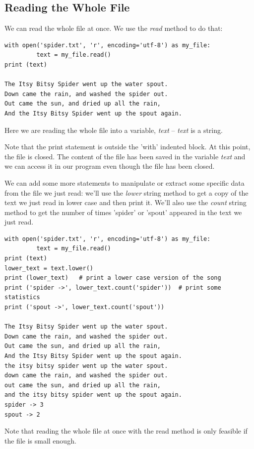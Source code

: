 \documentclass{article}
\begin{document}
\subsection{Reading the Whole File}

We can read the whole file at once.  We use the \textit{read} method to do that:

\begin{lstlisting}
with open('spider.txt', 'r', encoding='utf-8') as my_file:
         text = my_file.read()
print (text)

The Itsy Bitsy Spider went up the water spout.
Down came the rain, and washed the spider out.
Out came the sun, and dried up all the rain,
And the Itsy Bitsy Spider went up the spout again.
\end{lstlisting}

Here we are reading the whole file into a variable, \textit{text} – \textit{text} is a string.

Note that the print statement is outside the 'with' indented block.  At this point, the file is closed.  The content of the file has been saved in the variable \textit{text} and we can access it in our program even though the file has been closed.

We can add some more statements to manipulate or extract some specific data from the file we just read:  we'll use the \textit{lower} string method to get a copy of the text we just read in lower case and then print it.  We'll also use the \textit{count} string method to get the number of times 'spider' or 'spout'  appeared in the text we just read.

\begin{lstlisting}
with open('spider.txt', 'r', encoding='utf-8') as my_file:
         text = my_file.read()
print (text)
lower_text = text.lower()
print (lower_text)   # print a lower case version of the song
print ('spider ->', lower_text.count('spider'))  # print some statistics
print ('spout ->', lower_text.count('spout'))
 
The Itsy Bitsy Spider went up the water spout.
Down came the rain, and washed the spider out.
Out came the sun, and dried up all the rain,
And the Itsy Bitsy Spider went up the spout again.
the itsy bitsy spider went up the water spout.
down came the rain, and washed the spider out.
out came the sun, and dried up all the rain,
and the itsy bitsy spider went up the spout again.
spider -> 3
spout -> 2
\end{lstlisting}

Note that reading the whole file at once with the read method is only feasible if the file is small enough.  
\end{document}
